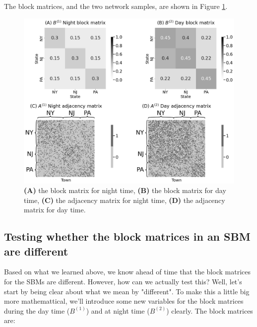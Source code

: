 The block matrices, and the two network samples, are shown in Figure \ref{fig:ch8:twosampsbm:ex}.

\begin{figure}
    \centering
    \includegraphics[width=\linewidth]{applications/ch8/Images/twosamp_sbm_ex.png}
    \caption[Two-sample SBM comparison]{\textbf{(A)} the block matrix for night time, \textbf{(B)} the block matrix for day time, \textbf{(C)} the adjacency matrix for night time, \textbf{(D)} the adjacency matrix for day time.}
    \label{fig:ch8:twosampsbm:ex}
\end{figure}

\subsection{Testing whether the block matrices in an SBM are different}

Based on what we learned above, we know ahead of time that the block matrices for the SBMs are different. However, how can we actually test this? Well, let's start by being clear about what we mean by "different". To make this a little big more mathemattical, we'll introduce some new variables for the block matrices during the day time ($B^{(1)}$) and at night time ($B^{(2)}$) clearly. The block matrices are:

